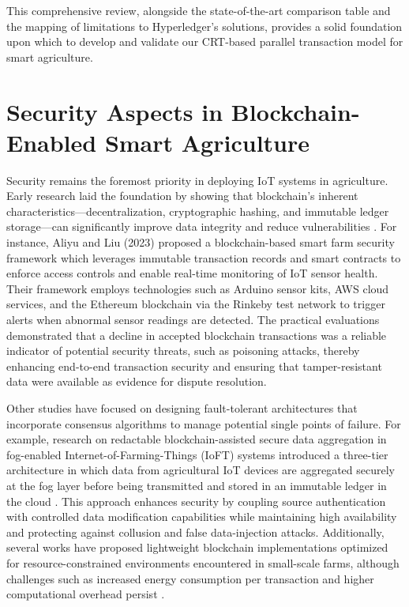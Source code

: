 \documentclass[12pt,onecolumn]{IEEEtran} %
\begin{document}
This comprehensive review, alongside the state-of-the-art comparison table and the mapping of limitations to Hyperledger's solutions, provides a solid foundation upon which to develop and validate our CRT-based parallel transaction model for smart agriculture.





\section{Security Aspects in Blockchain-Enabled Smart Agriculture}
Security remains the foremost priority in deploying IoT systems in agriculture. Early research laid the foundation by showing that blockchain's inherent characteristics—decentralization, cryptographic hashing, and immutable ledger storage—can significantly improve data integrity and reduce vulnerabilities \cite{aliyu2023blockchainbasedsmartfarm}. For instance, Aliyu and Liu (2023) proposed a blockchain-based smart farm security framework which leverages immutable transaction records and smart contracts to enforce access controls and enable real-time monitoring of IoT sensor health. Their framework employs technologies such as Arduino sensor kits, AWS cloud services, and the Ethereum blockchain via the Rinkeby test network to trigger alerts when abnormal sensor readings are detected. The practical evaluations demonstrated that a decline in accepted blockchain transactions was a reliable indicator of potential security threats, such as poisoning attacks, thereby enhancing end-to-end transaction security and ensuring that tamper-resistant data were available as evidence for dispute resolution.

Other studies have focused on designing fault-tolerant architectures that incorporate consensus algorithms to manage potential single points of failure. For example, research on redactable blockchain-assisted secure data aggregation in fog-enabled Internet-of-Farming-Things (IoFT) systems introduced a three-tier architecture in which data from agricultural IoT devices are aggregated securely at the fog layer before being transmitted and stored in an immutable ledger in the cloud \cite{mishra2023redactableblockchainassistedsecure}. This approach enhances security by coupling source authentication with controlled data modification capabilities while maintaining high availability and protecting against collusion and false data-injection attacks. Additionally, several works have proposed lightweight blockchain implementations optimized for resource-constrained environments encountered in small-scale farms, although challenges such as increased energy consumption per transaction and higher computational overhead persist \cite{shahzad2025decentralizediotbasedarchitectures}.
\end{document}
